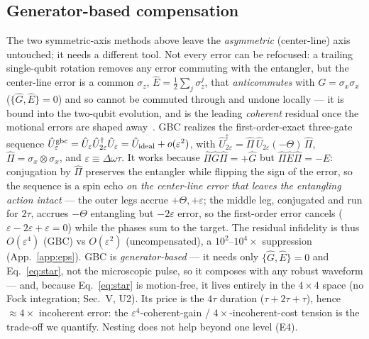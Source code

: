 \documentclass[aps,prapplied,twocolumn,superscriptaddress,floatfix,nofootinbib]{revtex4-2}
\begin{document}
\subsection{Generator-based compensation}\label{sec:gbc}
The two symmetric-axis methods above leave the \emph{asymmetric} (center-line) axis untouched; it
needs a different tool. Not every error can be refocused: a trailing single-qubit rotation removes any error commuting
with the entangler, but the center-line error is a common $\sigma_z$, $\hat E=\tfrac12\sum_j\sigma_z^j$,
that \emph{anticommutes} with $G=\sigma_x\sigma_x$ ($\{\hat G,\hat E\}=0$) and so cannot be commuted
through and undone locally --- it is bound into the two-qubit evolution, and is the leading
\emph{coherent} residual once the motional errors are shaped away~\cite{Pogorelov21,Postler22}.
GBC realizes the first-order-exact three-gate sequence
$\hat U^{\rm gbc}_\varepsilon=\hat U_\varepsilon\hat U^\dagger_{2\varepsilon}\hat U_\varepsilon
=\hat U_{\rm ideal}+o(\varepsilon^2)$, with $\hat U^\dagger_{2\varepsilon}=\hat\Pi\,\hat
U_{2\varepsilon}(-\Theta)\,\hat\Pi$, $\hat\Pi=\sigma_x\!\otimes\!\sigma_x$, and
$\varepsilon\equiv\Delta\omega\tau$. It works because $\hat\Pi\hat G\hat\Pi=+\hat G$ but
$\hat\Pi\hat E\hat\Pi=-\hat E$: conjugation by $\hat\Pi$ preserves the entangler while flipping
the sign of the error, so the sequence is a spin echo \emph{on the center-line error that leaves
the entangling action intact} --- the outer legs accrue $+\Theta,+\varepsilon$; the middle leg,
conjugated and run for $2\tau$, accrues $-\Theta$ entangling but $-2\varepsilon$ error, so the
first-order error cancels ($\varepsilon-2\varepsilon+\varepsilon=0$) while the phases sum to the
target. The residual infidelity is thus $O(\varepsilon^4)$ (GBC) vs $O(\varepsilon^2)$
(uncompensated), a $10^2$--$10^4\times$ suppression (App.~\ref{app:eps}). GBC is
\emph{generator-based} --- it needs only $\{\hat G,\hat E\}=0$ and Eq.~\eqref{eq:star}, not the
microscopic pulse, so it composes with any robust waveform --- and, because Eq.~\eqref{eq:star}
is motion-free, it lives entirely in the $4\times4$ space (no Fock integration; Sec.~V, U2). Its
price is the $4\tau$ duration ($\tau+2\tau+\tau$), hence $\approx4\times$ incoherent error: the
$\varepsilon^4$-coherent-gain / $4\times$-incoherent-cost tension is the trade-off we quantify.
Nesting does not help beyond one level (E4).
\end{document}
